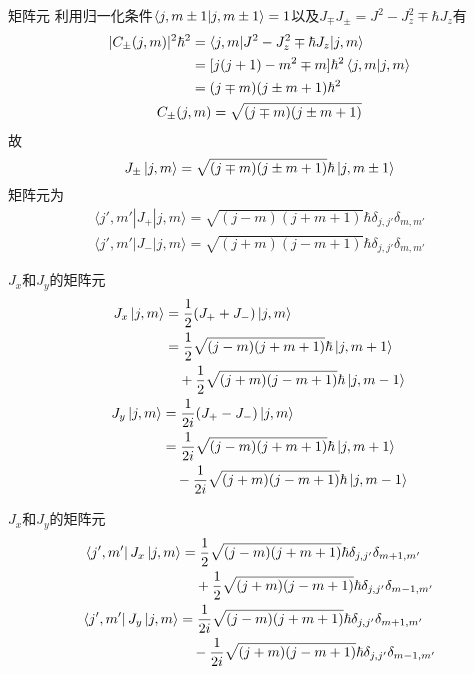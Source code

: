 \documentclass{beamer}
\begin{document}
\begin{frame}{矩阵元}
利用归一化条件$\braket{j,m\pm 1}{j,m\pm 1} = 1$以及$J_\mp J_\pm = J^2 -
J_z^2 \mp \hbar J_z$有
\begin{gather}
\begin{split}
|C_\pm (j,m)|^2 \hbar^2 &= \langle j,m | J^2 - J_z^2 \mp \hbar J_z | j,m \rangle \\
    &= [j(j+1) - m^2 \mp m] \hbar^2 \braket{j,m}{j,m} \\
    &= (j\mp m)(j\pm m + 1) \hbar^2
\end{split}\\
C_\pm (j,m) = \sqrt{(j\mp m)(j\pm m + 1)}
\end{gather}
故
\begin{equation}
J_\pm \ket{j,m} = \sqrt{(j\mp m)(j\pm m + 1)} \hbar \ket{j,m \pm 1}
\end{equation}
矩阵元为
\begin{gather}
\langle j', m' | J_+ | j,m \rangle = \sqrt{(j-m)(j+m+1)} \hbar \delta_{j,j'} \delta_{m,m'} \\
\langle j', m' | J_- | j,m \rangle = \sqrt{(j+m)(j-m+1)} \hbar \delta_{j,j'} \delta_{m,m'}
\end{gather}
\end{frame}

\begin{frame}{$J_x$和$J_y$的矩阵元}
\begin{gather}
\begin{split}
J_x \ket{j,m} &= \frac{1}{2}(J_+ + J_-) \ket{j,m} \\
    &= \frac{1}{2} \sqrt{(j-m)(j+m+1)}\hbar \ket{j,m+1} \\
    & \quad +\frac{1}{2} \sqrt{(j+m)(j-m+1)}\hbar \ket{j,m-1}
\end{split} \\
\begin{split}
J_y \ket{j,m} &= \frac{1}{2i}(J_+ - J_-) \ket{j,m} \\
    &= \frac{1}{2i} \sqrt{(j-m)(j+m+1)}\hbar \ket{j,m+1} \\
    & \quad -\frac{1}{2i} \sqrt{(j+m)(j-m+1)}\hbar \ket{j,m-1}
\end{split}
\end{gather}
\end{frame}

\begin{frame}{$J_x$和$J_y$的矩阵元}
\begin{gather}
\begin{split}
\bra{j',m'} J_x \ket{j,m} &= \frac{1}{2} \sqrt{(j-m)(j+m+1)}\hbar \delta_{j,j'} \delta_{m+1,m'} \\
    & \quad +\frac{1}{2} \sqrt{(j+m)(j-m+1)}\hbar \delta_{j,j'} \delta_{m-1,m'}
\end{split} \\
\begin{split}
\bra{j',m'} J_y \ket{j,m} &= \frac{1}{2i} \sqrt{(j-m)(j+m+1)}\hbar \delta_{j,j'} \delta_{m+1,m'} \\
    & \quad -\frac{1}{2i} \sqrt{(j+m)(j-m+1)}\hbar \delta_{j,j'} \delta_{m-1,m'}
\end{split}
\end{gather}
\end{frame}
\end{document}
